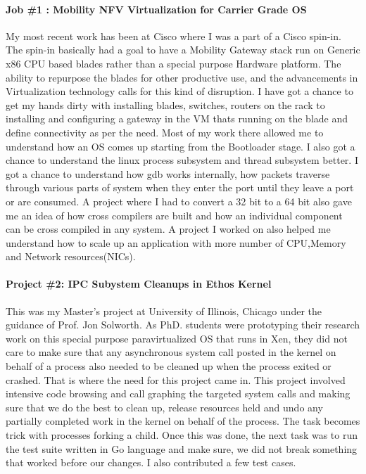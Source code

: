 \documentclass[letterpaper]{article}
\begin{document}
\paragraph{Job \#1 : Mobility NFV Virtualization for Carrier Grade OS}
My most recent work has been at Cisco where I was a part of a Cisco spin-in.
The spin-in basically had a goal to have a Mobility Gateway stack run on Generic
x86 CPU based blades rather than a special purpose Hardware platform. The ability 
to repurpose the blades for other productive use, and the advancements in Virtualization
technology calls for this kind of disruption. I have got a chance to get my hands dirty 
with installing blades, switches, routers on the rack to installing and configuring a gateway
in the VM thats running on the blade and define connectivity as per the need. Most of my work
there allowed me to understand how an OS comes up starting from the Bootloader stage. I also got
a chance to understand the linux process subsystem and thread subsystem better. I got a chance 
to understand how gdb works internally, how packets traverse through various parts of system when 
they enter the port until they leave a port or are consumed. A project where I had to convert a 
32 bit to a 64 bit also gave me an idea of how cross compilers are built and how an individual
component can be cross compiled in any system. A project I worked on also helped me understand
how to scale up an application with more number of CPU,Memory and Network resources(NICs).

\paragraph{Project \#2: IPC Subystem Cleanups in Ethos Kernel}
This was my Master's project at University of Illinois, Chicago under the guidance of 
Prof. Jon Solworth. As PhD. students were prototyping their research work on this
special purpose paravirtualized OS that runs in Xen, they did not care to make sure
that any asynchronous system call posted in the kernel on behalf of a process also needed to be 
cleaned up when the process exited or crashed. That is where the need for this 
project came in. This project involved intensive code browsing and call graphing
the targeted system calls and making sure that we do the best to clean up, release
resources held and undo any partially completed work in the kernel on behalf of the
process. The task becomes trick with processes forking a child.
Once this was done, the next task was to run the test suite written in Go language
and make sure, we did not break something that worked before our changes. I also contributed 
a few test cases.
\end{document}
